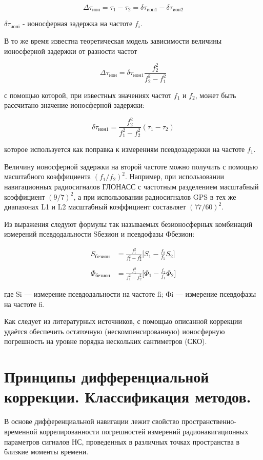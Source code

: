 \documentclass[14pt,a4paper,oneside]{extarticle}
\begin{document}
\[\Delta\tau_{\text{ион}} = \tau _ { 1 }-\tau_{2}=\delta\tau_{\text{ион}1}-\delta\tau_{\text{ион}2}\]

$\delta\tau_{\text{ионі}}$ - ионосферная задержка на частоте $f_i$.

В то же время известна теоретическая модель зависимости величины ионосферной задержки от разности частот

\[\Delta\tau_{\text{ион}} = \delta \tau_{\text{ион}1}\frac{f_{2}^{2}}{f_{2}^{2}-f_{1}^{2}}\]

с помощью которой, при известных значениях частот $f_1$ и $f_2$, может быть рассчитано значение ионосферной задержки:

\[\delta\tau_{\text{ион}1}=\frac{f_{2}^{2}}{f_{1}^{2}-f_{2}^{2}}\left(\tau_{1}-\tau_{2}\right)\]

которое используется как поправка к измерениям псевдозадержки на частоте $f_1$.

Величину ионосферной задержки на второй частоте можно получить с помощью
масштабного коэффициента $(f_1/f_2)^2$. Например, при использовании навигационных
радиосигналов ГЛОНАСС с частотным разделением масштабный коэффициент $(9/7)^2$, а
при использовании радиосигналов GPS в тех же диапазонах L1 и L2 масштабный
коэффициент составляет $(77/60)^2$.

Из выражения следуют формулы так называемых безионосферных комбинаций
измерений псевдодальности Sбезион и псевдофазы Фбезион:

\[\begin{aligned}S_{\text{безион}} & = \frac{f_{1}^{2}}{f_{1}^{2}-f_{2}^{2}}\Big[S_{1}-\frac{f_{2}}{f_{1}}S_{2}\Big]\\\\\Phi_{\text{безион}} & = \frac{f_{1}^{2}}{f_{1}^{2}-f_{2}^{2}}\Big[\Phi_{1}-\frac{f_{2}}{f_{1}}\Phi_{2}\Big]\end{aligned}\]

где Si –– измерение псевдодальности на частоте fi; Фi –– измерение псевдофазы на частоте fi.

Как следует из литературных источников, с помощью описанной коррекции удаётся обеспечить остаточную (нескомпенсированную) ионосферную погрешность на уровне порядка нескольких сантиметров (СКО).

\section{Принципы дифференциальной коррекции. Классификация методов.}

В основе дифференциальной навигации лежит свойство пространственно-временной коррелированности погрешностей измерений радионавигационных параметров сигналов НС, проведенных в различных точках пространства в близкие моменты времени.
\end{document}
